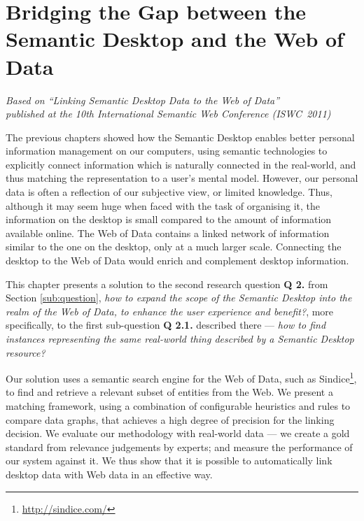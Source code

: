 \chapter{Bridging the Gap between the Semantic Desktop and the Web of Data}
\label{ch:sdwod}

\begin{flushright}
 \textit{Based on ``Linking Semantic Desktop Data to the Web of Data'' \cite{Dragan2011b}\\published at the 10th International Semantic Web Conference (ISWC~2011)}
\end{flushright}

The previous chapters showed how the Semantic Desktop enables better personal information management on our computers, using semantic technologies to explicitly connect information which is naturally connected in the real-world, and thus matching the representation to a user's mental model. However, our personal data is often a reflection of our subjective view, or limited knowledge. Thus, although it may seem huge when faced with the task of organising it, the information on the desktop is small compared to the amount of information available online. The Web of Data contains a linked network of information similar to the one on the desktop, only at a much larger scale. Connecting the desktop to the Web of Data would enrich and complement desktop information.

This chapter presents a solution to the second research question \textbf{Q 2.} from Section \ref{sub:question}, \emph{how to expand the scope of the Semantic Desktop into the realm of the Web of Data, to enhance the user experience and benefit?}, more specifically, to the first sub-question \textbf{Q 2.1.} described there --- \emph{how to find instances representing the same real-world thing described by a Semantic Desktop resource?}

Our solution uses a semantic search engine for the Web of Data, such as Sindice\footnote{\url{http://sindice.com/}}, to find and retrieve a relevant subset of entities from the Web. We present a matching framework, using a combination of configurable heuristics and rules to compare data graphs, that achieves a high degree of precision for the linking decision.
We evaluate our methodology with real-world data --- we create a gold standard from relevance judgements by experts; and measure the performance of our system against it. We thus show that it is possible to automatically link desktop data with Web data in an effective way.


